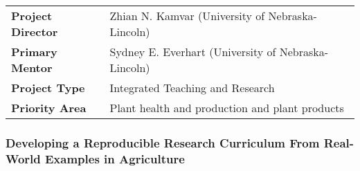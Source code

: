 \documentclass[12pt,letterpaper]{article}
\title{\ruleline{Project Summary}}
\begin{document}
\maketitle

\vspace{2em}

\begin{centering}
\begin{tabular}{ll}
\textbf{Project Director} & Zhian N. Kamvar (University of Nebraska-Lincoln)\\
\textbf{Primary Mentor  } & Sydney E. Everhart (University of Nebraska-Lincoln)\\
\textbf{Project Type    } & Integrated Teaching and Research\\
\textbf{Priority Area   } & Plant health and production and plant products
\end{tabular}
\end{centering}

\vspace{2em}

\subsubsection{Developing a Reproducible Research Curriculum From Real-World Examples in Agriculture}
\end{document}
